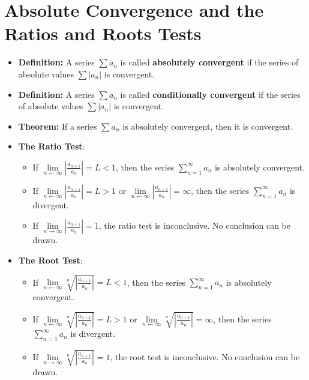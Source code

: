 \documentclass{report}
\begin{document}
	\section{Absolute Convergence and the Ratios and Roots Tests}
		\begin{itemize}\addtolength{\leftskip}{2em}
			\item \textbf{Definition:} A series $\sum a_n$ is called \textbf{absolutely convergent} if the series of absolute values $\sum |a_n|$ is convergent.
			\item \textbf{Definition:} A series $\sum a_n$ is called \textbf{conditionally convergent} if the series of absolute values $\sum |a_n|$ is convergent.
			\item \textbf{Theorem: }If a series $\sum a_n$ is absolutely convergent, then it is convergent.
			\item \textbf{The Ratio Test}:
			\begin{itemize}\addtolength{\leftskip}{4em}
				\item If $\lim\limits_{n\leftarrow \infty}|\frac{a_{n+1}}{a_n}|=L<1$, then the series $\sum\limits_{n=1}^{\infty}a_n$ is absolutely convergent.
				\item If $\lim\limits_{n\leftarrow \infty}|\frac{a_{n+1}}{a_n}|=L>1$ or $\lim\limits_{n\leftarrow \infty}|\frac{a_{n+1}}{a_n}|=\infty$, then the series $\sum\limits_{n=1}^{\infty}a_n$ is divergent.
				\item If $\lim\limits_{n\rightarrow \infty}|\frac{a_{n+1}}{a_n}|=1$, the ratio test is inconclusive. No conclusion can be drawn.
			\end{itemize}
			\item \textbf{The Root Test}:
			\begin{itemize}\addtolength{\leftskip}{4em}
				\item If $\lim\limits_{n\leftarrow \infty}\sqrt[n]{|\frac{a_{n+1}}{a_n}|}=L<1$, then the series $\sum\limits_{n=1}^{\infty}a_n$ is absolutely convergent.
				\item If $\lim\limits_{n\leftarrow \infty}\sqrt[n]{|\frac{a_{n+1}}{a_n}|}=L>1$ or $\lim\limits_{n\leftarrow \infty}\sqrt[n]{|\frac{a_{n+1}}{a_n}|}=\infty$, then the series $\sum\limits_{n=1}^{\infty}a_n$ is divergent.
				\item If $\lim\limits_{n\rightarrow \infty}\sqrt[n]{|\frac{a_{n+1}}{a_n}|}=1$, the root test is inconclusive. No conclusion can be drawn.
			\end{itemize}
		\end{itemize}
\end{document}
